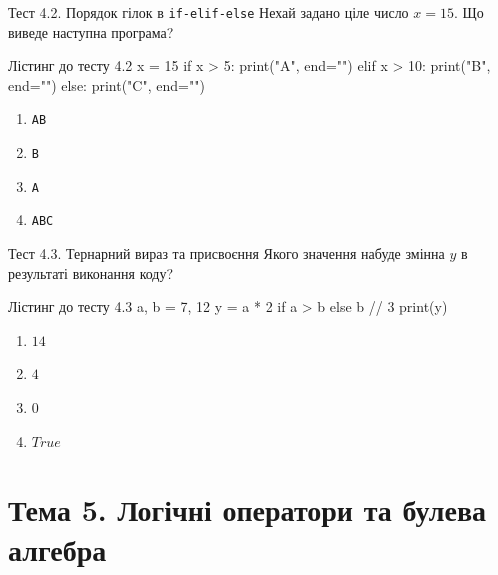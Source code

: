\begin{pr}{Тест 4.2. Порядок гілок в \texttt{if-elif-else}}
Нехай задано ціле число $x = 15$. Що виведе наступна програма?
\begin{py}{Лістинг до тесту 4.2}
x = 15
if x > 5:
    print("A", end="")
elif x > 10:
    print("B", end="")
else:
    print("C", end="")
\end{py}
\begin{enumerate}[label=\textbf{\Alph*.}]
	\item \texttt{AB}
	\item \texttt{B}
	\item \texttt{A}
	\item \texttt{ABC}
\end{enumerate}
\end{pr}

\begin{pr}{Тест 4.3. Тернарний вираз та присвоєння}
Якого значення набуде змінна $y$ в результаті виконання коду?
\begin{py}{Лістинг до тесту 4.3}
a, b = 7, 12
y = a * 2 if a > b else b // 3
print(y)
\end{py}
\begin{enumerate}[label=\textbf{\Alph*.}]
	\item $14$
	\item $4$
	\item $0$
	\item $True$
\end{enumerate}
\end{pr}

\section{Тема 5. Логічні оператори та булева алгебра}


